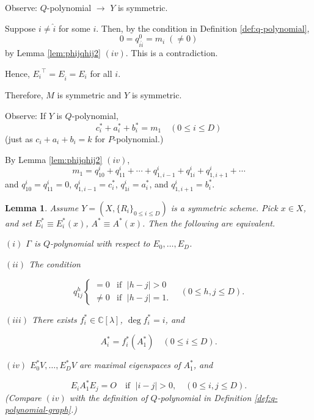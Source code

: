 \documentclass[
]{book}
\newtheorem{lemma}{Lemma}[chapter]
\theoremstyle{definition}
\theoremstyle{definition}
\theoremstyle{definition}
\theoremstyle{definition}
\theoremstyle{remark}
\begin{document}
Observe: \(Q\)-polynomial \(\to\) \(Y\) is symmetric.

Suppose \(i\neq \hat{i}\) for some \(i\). Then, by the condition in Definition \ref{def:q-polynomial},
\[0 = q^0_{i\hat{i}} = m_i \; (\neq 0)\]
by Lemma \ref{lem:phijqhij2} \((iv)\).
This is a contradiction.

Hence, \({E_i}^\top = E_{\hat{i}} = E_i\) for all \(i\).

Therefore, \(M\) is symmetric and \(Y\) is symmetric.

Observe: If \(Y\) is \(Q\)-polynomial,
\[c^*_i + a^*_i + b^*_i = m_1 \quad (0\leq i\leq D)\]
(just as \(c_i + a_i + b_i = k\) for \(P\)-polynomial.)

By Lemma \ref{lem:phijqhij2} \((iv)\),
\[m_1 = q^i_{10} + q^i_{11} + \cdots + q^i_{1,i-1} + q^i_{1i} + q^i_{1,i+1} + \cdots \]
and \(q^i_{10} = q^i_{11} = 0\), \(q^i_{1,i-1} = c^*_i\), \(q^i_{1i} = a^*_i\), and \(q^i_{1,i+1} = b^*_i\).

\begin{lemma}
\protect\hypertarget{lem:q-conditions}{}\label{lem:q-conditions}Assume \(Y = (X, \{R_i\}_{0\leq i\leq D})\) is a symmetric scheme. Pick \(x\in X\), and set \(E^*_i\equiv E^*_i(x)\), \(A^*\equiv A^*(x)\). Then the following are equivalent.

\((i)\) \(\Gamma\) is \(Q\)-polynomial with respect to \(E_0, \ldots, E_D\).

\((ii)\) The condition

\[q^h_{1j} \begin{cases} = 0 & \text{if $\; |h-j| > 0$} \\
\neq 0 & \text{if $\; |h-j| = 1$}. \end{cases} \quad (0\leq h,j\leq D).\]

\((iii)\) There exists \(f_i^*\in \mathbb{C}[\lambda]\), \(\deg f^*_i = i\), and

\[A^*_i = f^*_i(A^*_1) \quad (0\leq i\leq D).\]

\((iv)\) \(E^*_0V, \ldots, E^*_DV\) are maximal eigenspaces of \(A^*_1\), and

\[E_iA^*_1E_j = O \quad \text{if }\; |i-j|>0, \quad (0\leq i,j\leq D).\]
(Compare \((iv)\) with the definition of \(Q\)-polynomial in Definition \ref{def:q-polynomial-graph}.)
\end{lemma}
\end{document}
